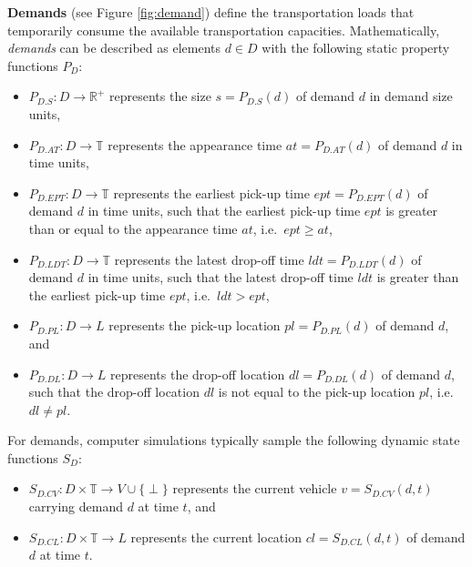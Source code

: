 \documentclass[graybox]{svmult}
\begin{document}
\noindent \textbf{Demands} (see Figure \ref{fig:demand}) define the transportation loads that temporarily consume the available transportation capacities.
Mathematically, \textit{demands} can be described as elements $d \in D$ with the following static property functions $P_{D}$:
\begin{itemize}
	\item $P_{D.S}: D \rightarrow \mathbb{R}^+$ represents the size $s = P_{D.S}(d)$ of demand $d$ in demand size units,
	\item $P_{D.AT}: D \rightarrow \mathbb{T}$ represents the appearance time $at = P_{D.AT}(d)$ of demand $d$ in time units,
	\item $P_{D.EPT}: D \rightarrow \mathbb{T}$ represents the earliest pick-up time $ept = P_{D.EPT}(d)$ of demand $d$ in time units, such that the earliest pick-up time $ept$ is greater than or equal to the appearance time $at$, i.e.\ $ept \geq at$,
	\item $P_{D.LDT}: D \rightarrow \mathbb{T}$ represents the latest drop-off time $ldt = P_{D.LDT}(d)$ of demand $d$ in time units, such that the latest drop-off time $ldt$ is greater than the earliest pick-up time $ept$, i.e.\ $ldt > ept$,
	\item $P_{D.PL}: D \rightarrow L$ represents the pick-up location $pl = P_{D.PL}(d)$ of demand $d$, and
	\item $P_{D.DL}: D \rightarrow L$ represents the drop-off location $dl = P_{D.DL}(d)$ of demand $d$, such that the drop-off location $dl$ is not equal to the pick-up location $pl$, i.e.\ $dl \neq pl$.
\end{itemize}
For demands, computer simulations typically sample the following dynamic state functions $S_{D}$:
\begin{itemize}
	\item $S_{D.CV}: D \times \mathbb{T} \rightarrow V \cup \{\perp\}$ represents the current vehicle $v = S_{D.CV}(d, t)$ carrying demand $d$ at time $t$, and
	\item $S_{D.CL}: D \times \mathbb{T} \rightarrow L$ represents the current location $cl = S_{D.CL}(d, t)$ of demand $d$ at time $t$.
\end{itemize}
\end{document}
